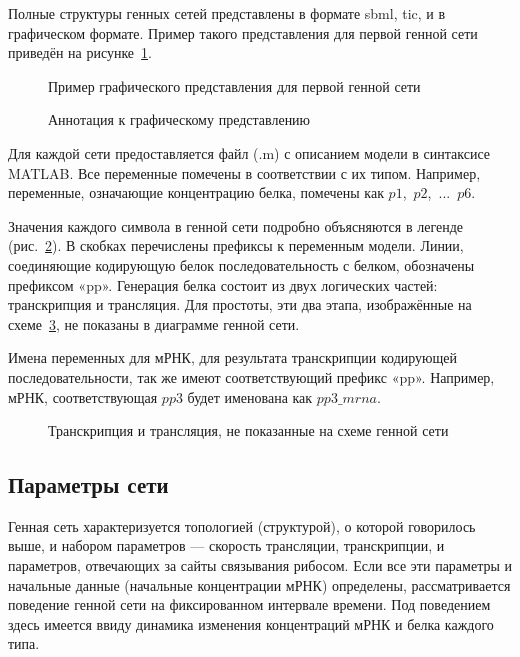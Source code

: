 Полные структуры генных сетей представлены в формате sbml, tic, и в графическом 
формате. Пример такого представления для первой генной сети приведён на 
рисунке~\ref{img:GrnImage}.

\begin{figure}[h]
  \caption{Пример графического представления для первой генной сети}
  \label{img:GrnImage}
\end{figure}

\begin{figure}[h]
  \caption{Аннотация к графическому представлению}
  \label{img:GrnImageDesc}
\end{figure}

Для каждой сети предоставляется файл (.m) с описанием модели в 
синтаксисе MATLAB. Все переменные помечены в соответствии с их типом. 
Например, переменные, означающие концентрацию белка, помечены как 
$p1$,~$p2$,~...~$p6$. 

Значения каждого символа в генной сети подробно 
объясняются в легенде (рис.~\ref{img:GrnImageDesc}). В скобках перечислены 
префиксы к переменным модели. Линии, соединяющие кодирующую белок 
последовательность с белком, обозначены префиксом «pp». Генерация белка состоит 
из двух логических частей: транскрипция и трансляция. Для простоты, эти два 
этапа, изображённые на схеме~\ref{img:GrnImageTT}, не показаны в диаграмме 
генной сети. 

Имена переменных для мРНК, для результата транскрипции кодирующей 
последовательности, так же имеют соответствующий префикс «pp». Например, мРНК, 
соответствующая $pp3$ будет именована как $pp3\_mrna$.

\begin{figure}[h]
  \caption{Транскрипция и трансляция, не показанные на схеме генной сети}
  \label{img:GrnImageTT}
\end{figure}

\subsection{Параметры сети} \label{sect2_2_2}

Генная сеть характеризуется топологией (структурой), о которой говорилось выше, 
и набором параметров — скорость трансляции, транскрипции, и параметров, 
отвечающих за сайты связывания рибосом. Если все эти параметры и начальные 
данные (начальные концентрации мРНК) определены, рассматривается поведение 
генной сети на фиксированном интервале времени. Под поведением здесь имеется 
ввиду динамика изменения концентраций мРНК и белка каждого типа.

